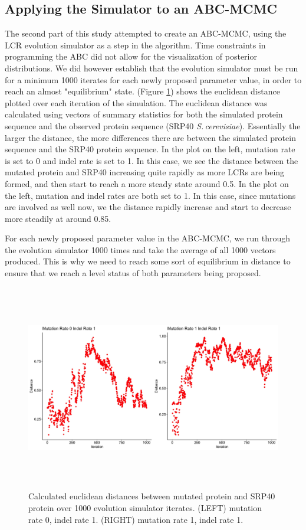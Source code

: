 \documentclass{article}
\providecommand{\figref}[1]{(Figure \ref{#1})}  %
\newcommand{\scshrt}{\mbox{\textit{S.\,cerevisiae}}\xspace}
\begin{document}
\subsection{Applying the Simulator to an ABC-MCMC}

The second part of this study attempted to create an ABC-MCMC, using the LCR evolution simulator as a step in the algorithm. Time constraints in programming the ABC did not allow for the visualization of posterior distributions. We did however establish that the evolution simulator must be run for a minimum 1000 iterates for each newly proposed parameter value, in order to reach an almost "equilibrium" state. \figref{fig:5} shows the euclidean distance plotted over each iteration of the simulation. The euclidean distance was calculated using vectors of summary statistics for both the simulated protein sequence and the observed protein sequence (SRP40 \scshrt). Essentially the larger the distance, the more differences there are between the simulated protein sequence and the SRP40 protein sequence. In the plot on the left, mutation rate is set to 0 and indel rate is set to 1. In this case, we see the distance between the mutated protein and SRP40 increasing quite rapidly as more LCRs are being formed, and then start to reach a more steady state around 0.5. In the plot on the left, mutation and indel rates are both set to 1. In this case, since mutations are involved as well now, we the distance rapidly increase and start to decrease more steadily at around 0.85.

For each newly proposed parameter value in the ABC-MCMC, we run through the evolution simulator 1000 times and take the average of all 1000 vectors produced. This is why we need to reach some sort of equilibrium in distance to ensure that we reach a level status of both parameters being proposed.

\begin{figure}[H]
	\includegraphics[width=18cm, height=9cm]{distances.jpeg}
	\caption{Calculated euclidean distances between mutated protein and SRP40 protein over 1000 evolution simulator iterates. (LEFT) mutation rate 0, indel rate 1. (RIGHT) mutation rate 1, indel rate 1.}
	\label{fig:5}
\end{figure}
\newpage
\end{document}
